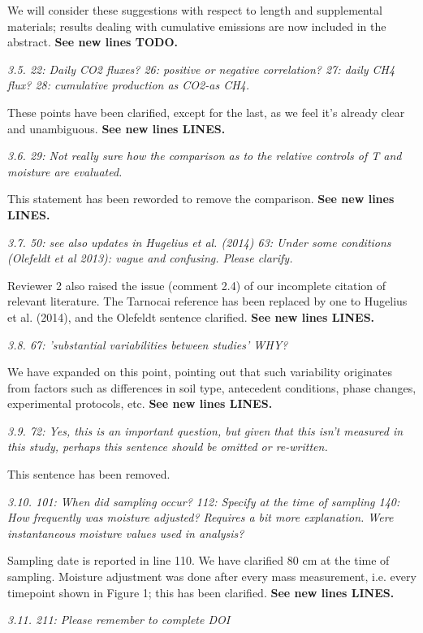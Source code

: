 \documentclass[11pt, oneside]{article}
\begin{document}
We will consider these suggestions with respect to length and supplemental materials; results dealing with cumulative emissions are now included in the abstract. {\bf See new lines TODO.}

\medskip
{\it 3.5. 22: Daily CO2 fluxes?
26: positive or negative correlation?
27: daily CH4 flux?
28: cumulative production as CO2-as CH4. }

These points have been clarified, except for the last, as we feel it's already clear and unambiguous. {\bf See new lines LINES.}

\medskip
{\it 3.6. 29: Not really sure how the comparison as to the relative controls of T and moisture are evaluated. }

This statement has been reworded to remove the comparison. {\bf See new lines LINES.}

\medskip
{\it 3.7. 50: see also updates in Hugelius et al. (2014)
63: Under some conditions (Olefeldt et al 2013): vague and confusing. Please clarify. }

Reviewer 2 also raised the issue (comment 2.4) of our incomplete citation of relevant literature. The Tarnocai reference has been replaced by one to Hugelius et al. (2014), and the Olefeldt sentence clarified. {\bf See new lines LINES.}

\medskip
{\it 3.8. 67: 'substantial variabilities between studies' WHY? }

We have expanded on this point, pointing out that such variability originates from factors such as differences in soil type, antecedent conditions, phase changes, experimental protocols, etc. {\bf See new lines LINES.}

\medskip
{\it 3.9. 72: Yes, this is an important question, but given that this isn't measured in this study, perhaps this sentence should be omitted or re-written. }

This sentence has been removed.

\medskip
{\it 3.10. 101: When did sampling occur?
112: Specify at the time of sampling
140: How frequently was moisture adjusted? Requires a bit more explanation. Were instantaneous moisture values used in analysis? }

Sampling date is reported in line 110. We have clarified 80 cm at the time of sampling. Moisture adjustment was done after every mass measurement, i.e. every timepoint shown in Figure 1; this has been clarified. {\bf See new lines LINES.}

\medskip
{\it 3.11. 211: Please remember to complete DOI }
\end{document}
